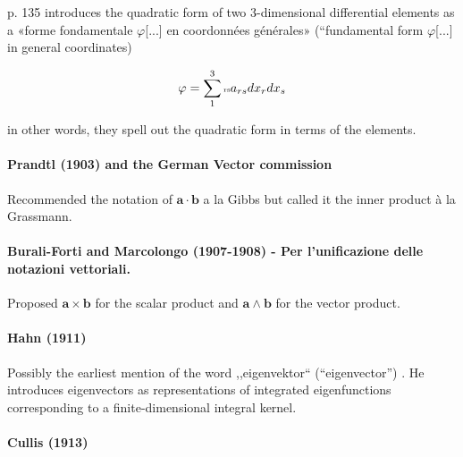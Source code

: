 p. 135 introduces the quadratic form of two 3-dimensional differential elements as a «forme fondamentale $\varphi$[...] en coordonnées générales» (``fundamental form $\varphi$[...] in general coordinates)

\[
\varphi = \sum_1^3 \text{\tiny{rs}} a_{rs} dx_r dx_s
\]

in other words, they spell out the quadratic form in terms of the elements.



\paragraph{Prandtl (1903) and the German Vector commission}

Recommended the notation of $\mathbf{a} \cdot \mathbf{b}$ a la Gibbs but called it the inner product à la Grassmann.



\paragraph{Burali-Forti and Marcolongo (1907-1908) - Per l’unificazione delle notazioni vettoriali.}

Proposed $\mathbf{a}\times\mathbf{b}$ for the scalar product and  $\mathbf{a}\wedge\mathbf{b}$ for the vector product.



\paragraph{Hahn (1911)~\cite{Hahn1911}}

Possibly the earliest mention of the word ,,eigenvektor`` (``eigenvector'') \cite[p. 35]{Hahn1911}.
He introduces eigenvectors as representations of integrated eigenfunctions corresponding to a finite-dimensional integral kernel.



\paragraph{Cullis (1913)}

